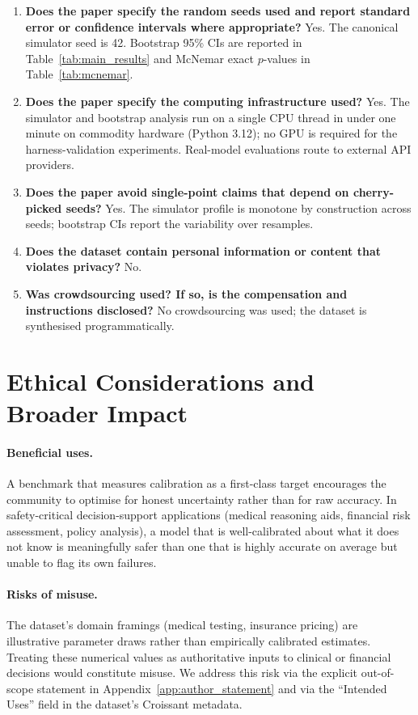 \documentclass{article}
\begin{document}
\begin{enumerate}[leftmargin=*,itemsep=2pt]
    \item \textbf{Does the paper specify the random seeds used and report standard error or confidence intervals where appropriate?} Yes. The canonical simulator seed is 42. Bootstrap 95\% CIs are reported in Table~\ref{tab:main_results} and McNemar exact $p$-values in Table~\ref{tab:mcnemar}.
    \item \textbf{Does the paper specify the computing infrastructure used?} Yes. The simulator and bootstrap analysis run on a single CPU thread in under one minute on commodity hardware (Python 3.12); no GPU is required for the harness-validation experiments. Real-model evaluations route to external API providers.
    \item \textbf{Does the paper avoid single-point claims that depend on cherry-picked seeds?} Yes. The simulator profile is monotone by construction across seeds; bootstrap CIs report the variability over resamples.
    \item \textbf{Does the dataset contain personal information or content that violates privacy?} No.
    \item \textbf{Was crowdsourcing used? If so, is the compensation and instructions disclosed?} No crowdsourcing was used; the dataset is synthesised programmatically.
\end{enumerate}


\section{Ethical Considerations and Broader Impact}
\label{app:ethics}

\paragraph{Beneficial uses.} A benchmark that measures calibration as a first-class target encourages the community to optimise for honest uncertainty rather than for raw accuracy. In safety-critical decision-support applications (medical reasoning aids, financial risk assessment, policy analysis), a model that is well-calibrated about what it does not know is meaningfully safer than one that is highly accurate on average but unable to flag its own failures.

\paragraph{Risks of misuse.} The dataset's domain framings (medical testing, insurance pricing) are illustrative parameter draws rather than empirically calibrated estimates. Treating these numerical values as authoritative inputs to clinical or financial decisions would constitute misuse. We address this risk via the explicit out-of-scope statement in Appendix~\ref{app:author_statement} and via the ``Intended Uses'' field in the dataset's Croissant metadata.
\end{document}
